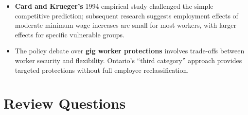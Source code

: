 \begin{itemize}
  \item \textbf{Card and Krueger's} 1994 empirical study challenged the simple competitive prediction; subsequent research suggests employment effects of moderate minimum wage increases are small for most workers, with larger effects for specific vulnerable groups.
  \item The policy debate over \textbf{gig worker protections} involves trade-offs between worker security and flexibility. Ontario's ``third category'' approach provides targeted protections without full employee reclassification.
\end{itemize}

\section*{Review Questions}

